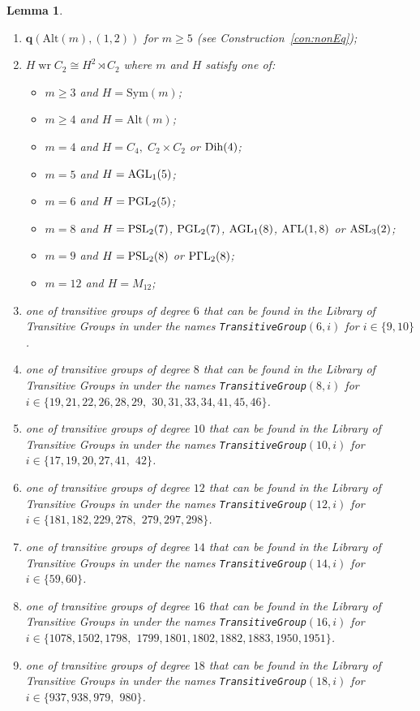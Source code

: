 \documentclass[a4paper]{amsart}
\newcommand{\Sym}{\mathrm{Sym}}
\newcommand{\Alt}{\mathrm{Alt}}
\renewcommand{\wr}{\mathop{\mathrm{wr}}}
\newcommand{\qrk}{\mathbf{q}}
\newcommand{\PGammaL}{\rm P\Gamma L}
\newcommand{\AGammaL}{\rm A\Gamma L}
\newcommand{\PGL}{\rm PGL}
\newcommand{\PSL}{\rm PSL}
\newcommand{\Dih}{\rm Dih}
\newcommand{\ASL}{\rm ASL}
\newcommand{\AGL}{\rm AGL}
\newtheorem{lemma}[theorem]{Lemma}
\theoremstyle{definition}
\begin{document}
\begin{lemma}
\begin{enumerate}[$(i)$]
        \item $\qrk(\Alt(m),(1,2))$ for $m\ge 5$ (see Construction~\ref{con:nonEq});
        \item $H \wr C_2 \cong H^2 \rtimes C_2$ where $m$ and $H$ satisfy one of:
        \begin{itemize}
           \item $m\ge 3$ and $ H = \Sym(m)$;
           \item $m\ge 4$ and $ H = \Alt(m)$;
           \item $m=4$ and $H =C_4,\; C_2\times C_2$ or $\Dih(4)$;
           \item $m=5$ and $H=\AGL_1(5)$;
           \item $m=6$ and $H=\PGL_2(5)$;
           \item $m=8$ and $H=\PSL_2(7)$, $\PGL_2(7)$, $\AGL_1(8)$, $\AGammaL(1,8)$ or $\ASL_3(2)$;
           \item $m=9$ and $H=\PSL_2(8)$ or $\PGammaL_2(8)$;
           \item $m=12$ and $H=M_{12}$;
        \end{itemize}
       \item one of transitive groups of degree $6$ that
       can be found in the Library of Transitive Groups in \cite{magma} under the names {\tt TransitiveGroup}$(6,i)$ for $i \in \{9,10\}$. 
       \item one of transitive groups of degree $8$ that
       can be found in the Library of Transitive Groups in \cite{magma} under the names {\tt TransitiveGroup}$(8,i)$ for $i \in \{19,21,22,26,28,29,$ $30,31,33,34,41,45,46\}$.
       \item one of transitive groups of degree $10$ that
       can be found in the Library of Transitive Groups in \cite{magma} under the names {\tt TransitiveGroup}$(10,i)$ for $i \in \{17,19,20,27,41,$ $42\}$.
       \item one of transitive groups of degree $12$ that
       can be found in the Library of Transitive Groups in \cite{magma} under the names {\tt TransitiveGroup}$(12,i)$ for $i \in \{181,182,229,278,$ $279,297,298\}$.
       \item one of transitive groups of degree $14$ that
       can be found in the Library of Transitive Groups in \cite{magma} under the names {\tt TransitiveGroup}$(14,i)$ for $i \in \{59,60\}$.
       \item one of transitive groups of degree $16$ that
       can be found in the Library of Transitive Groups in \cite{magma} under the names {\tt TransitiveGroup}$(16,i)$ for $i \in \{1078, 1502, 1798,$ $1799, 1801, 1802, 1882, 1883, 1950, 1951\}$.
       \item one of transitive groups of degree $18$ that
       can be found in the Library of Transitive Groups in \cite{magma} under the names {\tt TransitiveGroup}$(18,i)$ for $i \in \{ 937, 938, 979,$ $980\}$.
    \end{enumerate}
\end{lemma}
\end{document}

